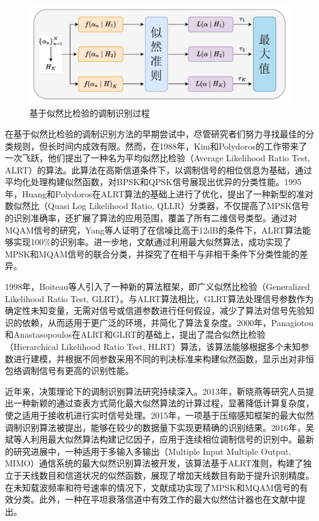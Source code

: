 \begin{figure}
    \centering
    \includegraphics[width=\textwidth]{Image/likelihood.pdf}
    \caption{基于似然比检验的调制识别过程}
    \label{fig:likelihood}
\end{figure}

在基于似然比检验的调制识别方法的早期尝试中，尽管研究者们努力寻找最佳的分类规则，但长时间内成效有限。然而，在1988年，Kim和Polydoros的工作带来了一次飞跃，他们提出了一种名为平均似然比检验（Average Likelihood Ratio Test, ALRT）的算法\cite{kim1988digital}。此算法在高斯信道条件下，以调制信号的相位信息为基础，通过平均化处理构建似然函数，对BPSK和QPSK信号展现出优异的分类性能。1995年，Huang和Polydoros在ALRT算法的基础上进行了优化\cite{huan1995likelihood}，提出了一种新型的准对数似然比（Quasi Log Likelihood Ratio, QLLR）分类器，不仅提高了MPSK信号的识别准确率，还扩展了算法的应用范围，覆盖了所有二维信号类型。通过对MQAM信号的研究，Yang等人\cite{yang1998log}证明了在信噪比高于12dB的条件下，ALRT算法能够实现100\%的识别率。进一步地，文献\cite{sills1999maximum}通过利用最大似然算法，成功实现了MPSK和MQAM信号的联合分类，并探究了在相干与非相干条件下分类性能的差异。

1998年，Boiteau等人引入了一种新的算法框架，即广义似然比检验（Generalized Likelihood Ratio Test, GLRT）\cite{boiteau1998general}。与ALRT算法相比，GLRT算法处理信号参数作为确定性未知变量，无需对信号或信道参数进行任何假设，减少了算法对信号先验知识的依赖，从而适用于更广泛的环境，并简化了算法复杂度。2000年，Panagiotou和Anastasopoulos在ALRT和GLRT的基础上，提出了混合似然比检验（Hierarchical Likelihood Ratio Test, HLRT）算法\cite{panagiotou2000likelihood}，该算法能够根据多个未知参数进行建模，并根据不同参数采用不同的判决标准来构建似然函数，显示出对非恒包络调制信号有更高的识别性能。

近年来，决策理论下的调制识别算法研究持续深入。2013年，靳晓燕等研究人员提出一种新颖的通过查表方式简化最大似然算法的计算过程\cite{靳晓艳2013一种最大似然调制识别的快速算法}，显著降低计算复杂度，使之适用于接收机进行实时信号处理。2015年，一项基于压缩感知框架的最大似然调制识别算法被提出\cite{童年2015非重构压缩样值的}，能够在较少的数据量下实现更精确的识别结果。2016年，吴斌等人\cite{吴斌2016基于记忆因子的连续相位调制信号最大似然调制识别}利用最大似然算法构建记忆因子，应用于连续相位调制信号的识别中。最新的研究进展中，一种适用于多输入多输出（Multiple Input Multiple Output, MIMO）通信系统的最大似然识别算法被开发，该算法基于ALRT准则，构建了独立于天线数目和信道状况的似然函数，展现了增加天线数目有助于提升识别精度。在未知载波频率和符号速率的情况下，文献\cite{zhu2018likelihood}成功实现了MPSK和MQAM信号的有效分类。此外，一种在平坦衰落信道中有效工作的最大似然估计器也在文献\cite{chen2019faster}中提出。

